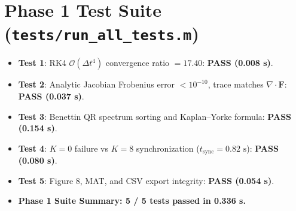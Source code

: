 \documentclass[12pt,a4paper,oneside]{report}
\begin{document}
\section{Phase 1 Test Suite (\texttt{tests/run\_all\_tests.m})}
\begin{itemize}
    \item \textbf{Test 1}: RK4 $\mathcal{O}(\Delta t^4)$ convergence ratio $= 17.40$: \textbf{PASS (0.008 s)}.
    \item \textbf{Test 2}: Analytic Jacobian Frobenius error $< 10^{-10}$, trace matches $\nabla \cdot \mathbf{F}$: \textbf{PASS (0.037 s)}.
    \item \textbf{Test 3}: Benettin QR spectrum sorting and Kaplan--Yorke formula: \textbf{PASS (0.154 s)}.
    \item \textbf{Test 4}: $K=0$ failure vs $K=8$ synchronization ($t_{\text{sync}} = 0.82\text{ s}$): \textbf{PASS (0.080 s)}.
    \item \textbf{Test 5}: Figure 8, MAT, and CSV export integrity: \textbf{PASS (0.054 s)}.
    \item \textbf{Phase 1 Suite Summary: 5 / 5 tests passed in 0.336 s.}
\end{itemize}
\end{document}
